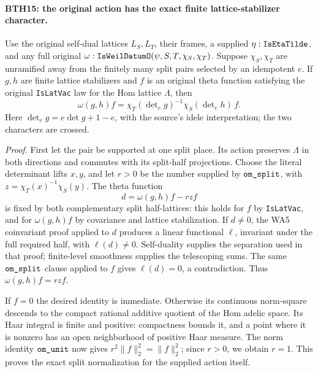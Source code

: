 \paragraph{BTH15: the original action has the exact finite lattice-stabilizer character.}
\label{claim:BTH15}
Use the original self-dual lattices \(L_S,L_T\),
their frames, a supplied \(\eta:\texttt{Is\allowbreak Eta\allowbreak Tilde}\),
and any full original
\(\omega:\texttt{Is\allowbreak Weil\allowbreak Datum\allowbreak O}(\psi,S,T,\chi_S,\chi_T)\).
Suppose \(\chi_S,\chi_T\) are unramified away from
the finitely many split pairs selected by an idempotent
\(e\).  If \(g,h\) are finite lattice stabilizers and
\(f\) is an original theta function satisfying the
original \texttt{Is\allowbreak Lat\allowbreak Vac} law for the Hom lattice
\(\Lambda\), then
\[
 \omega(g,h)f=
 \chi_T(\det\nolimits_e g)^{-1}
          \chi_S(\det\nolimits_e h)\,f.                       \tag{BTH.53}
\]
Here \(\det_e g=e\det g+1-e\), with the source's
idele interpretation; the two characters are crossed.

\emph{Proof.}
First let the pair be supported at one split place.
Its action preserves \(\Lambda\) in both directions
and commutes with its split-half projections.
Choose the literal determinant lifts \(x,y\), and
let \(r>0\) be the number supplied by
\(\texttt{om\_\allowbreak split}\), with
\(z=\chi_T(x)^{-1}\chi_S(y)\).
The theta function
\[
                         d=\omega(g,h)f-rzf
\]
is fixed by both complementary split half-lattices:
this holds for \(f\) by \texttt{Is\allowbreak Lat\allowbreak Vac}, and for
\(\omega(g,h)f\) by covariance and lattice
stabilization.  If \(d\ne0\), the WA5 coinvariant
proof applied to \(d\) produces a linear functional
\(\ell\), invariant under the full required half,
with \(\ell(d)\ne0\).
Self-duality supplies the separation used in that
proof; finite-level smoothness supplies the
telescoping sums.  The same
\(\texttt{om\_\allowbreak split}\) clause applied to \(f\)
gives \(\ell(d)=0\), a contradiction.
Thus \(\omega(g,h)f=rzf\).

If \(f=0\) the desired identity is immediate.
Otherwise its continuous norm-square descends to
the compact rational additive quotient of the
Hom adelic space.  Its Haar integral is finite
and positive: compactness bounds it, and a point
where it is nonzero has an open neighborhood of
positive Haar measure.  The norm identity
\(\texttt{om\_\allowbreak unit}\) now gives
\(r^2\|f\|_2^2=\|f\|_2^2\); since \(r>0\),
we obtain \(r=1\).  This proves the exact split
normalization for the supplied action itself.

